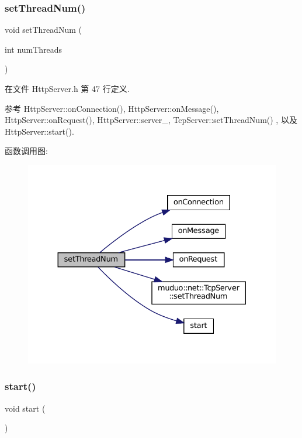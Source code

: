 \subsubsection{\texorpdfstring{set\+Thread\+Num()}{setThreadNum()}}
{\footnotesize\ttfamily void set\+Thread\+Num (\begin{DoxyParamCaption}\item[{int}]{num\+Threads }\end{DoxyParamCaption})\hspace{0.3cm}{\ttfamily [inline]}}



在文件 Http\+Server.\+h 第 47 行定义.



参考 Http\+Server\+::on\+Connection(), Http\+Server\+::on\+Message(), Http\+Server\+::on\+Request(), Http\+Server\+::server\+\_\+, Tcp\+Server\+::set\+Thread\+Num() , 以及 Http\+Server\+::start().

函数调用图\+:
\nopagebreak
\begin{figure}[H]
\begin{center}
\leavevmode
\includegraphics[width=330pt]{classmuduo_1_1net_1_1HttpServer_a83bb28d139df96ba9fc449b4643f2c36_cgraph}
\end{center}
\end{figure}
\mbox{\label{classmuduo_1_1net_1_1HttpServer_a60de64d75454385b23995437f1d72669}} 
\subsubsection{\texorpdfstring{start()}{start()}}
{\footnotesize\ttfamily void start (\begin{DoxyParamCaption}{ }\end{DoxyParamCaption})}




